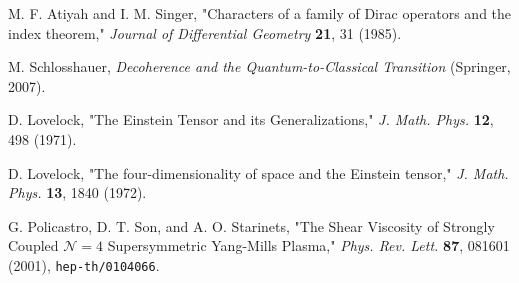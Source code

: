 \documentclass[11pt, letterpaper]{report}
\theoremstyle{plain} %
\theoremstyle{definition} %
\theoremstyle{remark} %
\begin{document}
\begin{thebibliography}{99}
M. F. Atiyah and I. M. Singer, "Characters of a family of Dirac operators and the index theorem," \textit{Journal of Differential Geometry} \textbf{21}, 31 (1985). %

M. Schlosshauer, \textit{Decoherence and the Quantum-to-Classical Transition} (Springer, 2007).


D. Lovelock, "The Einstein Tensor and its Generalizations," \textit{J. Math. Phys.} \textbf{12}, 498 (1971).

D. Lovelock, "The four-dimensionality of space and the Einstein tensor," \textit{J. Math. Phys.} \textbf{13}, 1840 (1972).


G. Policastro, D. T. Son, and A. O. Starinets, "The Shear Viscosity of Strongly Coupled $\mathcal{N}=4$ Supersymmetric Yang-Mills Plasma," \textit{Phys. Rev. Lett.} \textbf{87}, 081601 (2001), \texttt{hep-th/0104066}.

\end{thebibliography}
\end{document}
